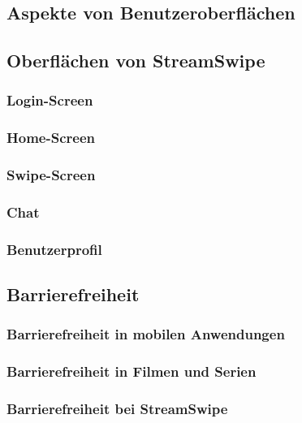 \documentclass[11pt,a4paper]{article}
\begin{document}
\subsection{Aspekte von Benutzeroberflächen}
\label{sec:UI-Aspekte}

\subsection{Oberflächen von StreamSwipe}
\label{sec:UI-alle}

\subsubsection{Login-Screen}
\label{sec:loginscreen}

\subsubsection{Home-Screen}
\label{sec:homescreen}

\subsubsection{Swipe-Screen}
\label{sec:swipescreen}

\subsubsection{Chat}
\label{sec:UI-Chat}

\subsubsection{Benutzerprofil}
\label{sec:benutzerprofil}

\subsection{Barrierefreiheit}
\label{sec:barrierefreiheit}

\subsubsection{Barrierefreiheit in mobilen Anwendungen}

\subsubsection{Barrierefreiheit in Filmen und Serien}

\subsubsection{Barrierefreiheit bei StreamSwipe}
\label{sec:bf-streamswipe}

\end{document}
